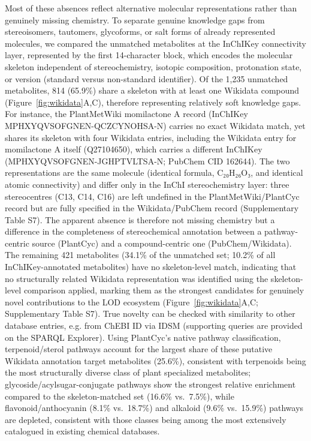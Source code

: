 \documentclass[11pt,a4paper]{article}
\begin{document}
Most of these absences reflect alternative molecular representations rather than genuinely missing
chemistry. To separate genuine knowledge gaps from stereoisomers, tautomers, glycoforms, or salt forms
of already represented molecules, we compared the unmatched metabolites at the InChIKey connectivity
layer, represented by the first 14-character block, which encodes the molecular skeleton independent
of stereochemistry, isotopic composition, protonation state, or version (standard versus non-standard identifier). Of the 1,235 unmatched metabolites,
814 (65.9\%) share a skeleton with at least one Wikidata compound (Figure~\ref{fig:wikidata}A,C),
therefore representing relatively soft knowledge gaps. For instance, the PlantMetWiki momilactone A
record (InChIKey MPHXYQVSOFGNEN-QCZCYNOHSA-N) carries no exact Wikidata match, yet shares its skeleton
with four Wikidata entries, including the Wikidata entry for momilactone A itself (Q27104650), which
carries a different InChIKey (MPHXYQVSOFGNEN-JGHPTVLTSA-N; PubChem CID 162644). The two
representations are the same molecule (identical formula, C₂₀H₂₆O₃, and identical atomic connectivity)
and differ only in the InChI stereochemistry layer: three stereocentres (C13, C14, C16) are left
undefined in the PlantMetWiki/PlantCyc record but are fully specified in the Wikidata/PubChem record
(Supplementary Table S7). The apparent absence is therefore not missing chemistry but a difference in
the completeness of stereochemical annotation between a pathway-centric source (PlantCyc) and a
compound-centric one (PubChem/Wikidata). The remaining 421 metabolites (34.1\% of the unmatched set;
10.2\% of all InChIKey-annotated metabolites) have no skeleton-level match, indicating that
no structurally related Wikidata representation was identified using the skeleton-level comparison applied,
marking them as the strongest candidates for
genuinely novel contributions to the LOD ecosystem (Figure~\ref{fig:wikidata}A,C; Supplementary Table
S7).
True novelty can be checked with similarity to other database entries, e.g. from ChEBI ID via IDSM
(supporting queries are provided on the SPARQL Explorer). Using PlantCyc's native pathway
classification, terpenoid/sterol pathways account for the largest share of these putative Wikidata
annotation target metabolites (25.6\%), consistent with terpenoids being the most structurally diverse class of plant
specialized metabolites; glycoside/acylsugar-conjugate pathways show the strongest relative enrichment
compared to the skeleton-matched set (16.6\% vs.\ 7.5\%), while flavonoid/anthocyanin (8.1\% vs.\
18.7\%) and alkaloid (9.6\% vs.\ 15.9\%) pathways are depleted, consistent with those classes being
among the most extensively catalogued in existing chemical databases.
\end{document}
